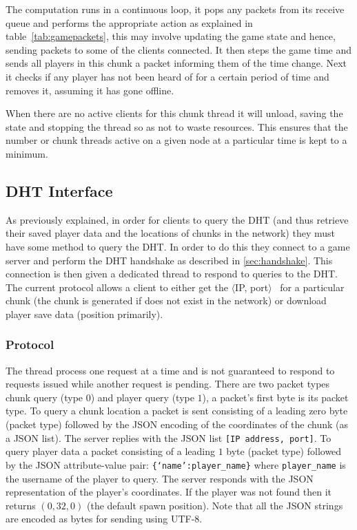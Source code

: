 \documentclass[12pt,notitlepage,a4paper]{report}
\begin{document}
	The computation runs in a continuous loop, it pops any packets from its receive queue and performs the appropriate action as explained in table~\ref{tab:gamepackets}, this may involve updating the game state and hence, sending packets to some of the clients connected. It then steps the game time and sends all players in this chunk a packet informing them of the time change. Next it checks if any player has not been heard of for a certain period of time and removes it, assuming it has gone offline.
	
	When there are no active clients for this chunk thread it will unload, saving the state and stopping the thread so as not to waste resources. This ensures that the number or chunk threads active on a given node at a particular time is kept to a minimum.
	
	\subsection{DHT Interface}
	\label{sec:interface}
	As previously explained, in order for clients to query the DHT (and thus retrieve their saved player data and the locations of chunks in the network) they must have some method to query the DHT. In order to do this they connect to a game server and perform the DHT handshake as described in \cref{sec:handshake}. This connection is then given a dedicated thread to respond to queries to the DHT. The current protocol allows a client to either get the $\langle$IP, port$\rangle$~ for a particular chunk (the chunk is generated if does not exist in the network) or download player save data (position primarily).
	
	\subsubsection{Protocol}
	The thread process one request at a time and is not guaranteed to respond to requests issued while another request is pending. There are two packet types chunk query (type $0$) and player query (type $1$), a packet's first byte is its packet type. To query a chunk location a packet is sent consisting of a leading zero byte (packet type) followed by the JSON encoding of the coordinates of the chunk (as a JSON list). The server replies with the JSON list \texttt{[IP address, port]}. To query player data a packet consisting of a leading $1$ byte (packet type) followed by the JSON attribute-value pair: \texttt{\{`name':player\_name\}} where \texttt{player\_name} is the username of the player to query. The server responds with the JSON representation of the player's coordinates. If the player was not found then it returns $(0,32,0)$ (the default spawn position). Note that all the JSON strings are encoded as bytes for sending using UTF-8.
	
\end{document}
